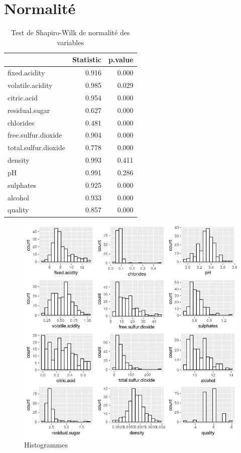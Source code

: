\documentclass[11pt,a4paper]{article}
\begin{document}
\section{Normalité}
\label{sec:normalite}
\begin{table}[h]
	\centering
	\begin{tabular}{lrr}
		\hline
		& Statistic & p.value \\ 
		\hline
		fixed.acidity & 0.916 & 0.000 \\ 
		volatile.acidity & 0.985 & 0.029 \\ 
		citric.acid & 0.954 & 0.000 \\ 
		residual.sugar & 0.627 & 0.000 \\ 
		chlorides & 0.481 & 0.000 \\ 
		free.sulfur.dioxide & 0.904 & 0.000 \\ 
		total.sulfur.dioxide & 0.778 & 0.000 \\ 
		density & 0.993 & 0.411 \\ 
		pH & 0.991 & 0.286 \\ 
		sulphates & 0.925 & 0.000 \\ 
		alcohol & 0.933 & 0.000 \\ 
		quality & 0.857 & 0.000 \\ 
		\hline
	\end{tabular}
\caption{Test de Shapiro-Wilk de normalité des variables}
\label{table:shapiro}
\end{table}


\begin{figure}

\includegraphics[width=\textwidth,keepaspectratio]{"histogram"}

\caption{Histogrammes}
\label{fig:histo}
\end{figure}
\end{document}
